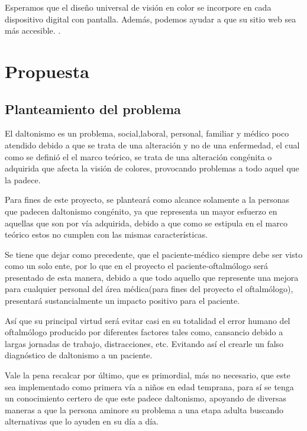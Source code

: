 \documentclass[10pt]{article}
\begin{document}
\setlength{\parskip}{2mm}

Esperamos que el diseño universal de visión en color se incorpore en cada dispositivo digital con pantalla. Además, podemos ayudar a que su sitio web sea más accesible.
\cite{IEEEreferencias:Ref20}.

\newpage
\section{Propuesta}

\subsection{Planteamiento del problema}

El daltonismo es un problema, social,laboral, personal, familiar y médico poco atendido debido a que se trata de una alteración y no de una enfermedad, el cual como se definió el el marco teórico, se trata de una alteración congénita o adquirida que afecta la visión de colores, provocando problemas a todo aquel que la padece.

Para fines de este proyecto, se planteará como alcance solamente a la personas que padecen daltonismo congénito, ya que representa un mayor esfuerzo en aquellas que son por vía adquirida, debido a que como se estipula en el marco teórico estos no cumplen con las mismas características.

Se tiene que dejar como precedente, que el paciente-médico siempre debe ser visto como un solo ente, por lo que en el proyecto el paciente-oftalmólogo será presentado de esta manera, debido a que todo aquello que represente una mejora para cualquier personal del área médica(para fines del proyecto el oftalmólogo), presentará sustancialmente un impacto positivo para el paciente.

Así que su principal virtud será evitar casi en su totalidad el error humano del oftalmólogo producido por diferentes factores tales como, cansancio debido a largas jornadas de trabajo, distracciones, etc. Evitando así el crearle un falso diagnóstico de daltonismo a un paciente.

Vale la pena recalcar por último, que es primordial, más no necesario, que este sea implementado como primera vía a niños en edad temprana, para sí se tenga un conocimiento certero de que este padece daltonismo, apoyando de diversas maneras a que la persona aminore su problema a una etapa adulta buscando alternativas que lo ayuden en su día a día.
\end{document}
